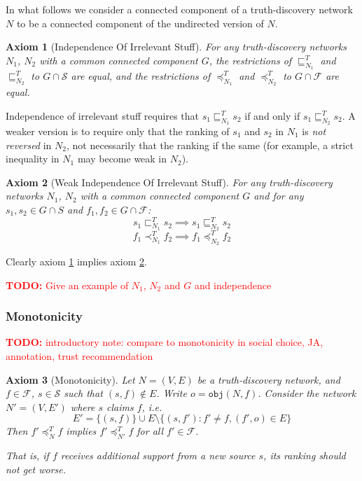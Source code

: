\documentclass{article}
\theoremstyle{definition} \newtheorem{definition}{Definition}
\theoremstyle{definition} \newtheorem{example}{Example}
\theoremstyle{plain} \newtheorem{axiom}{Axiom}
\theoremstyle{plain} \newtheorem*{remark}{Remark}
\theoremstyle{remark} \newtheorem*{notation}{Notation}
\theoremstyle{plain} \newtheorem{lemma}{Lemma}
\theoremstyle{plain} \newtheorem{theorem}{Theorem}
\theoremstyle{plain} \newtheorem{proposition}{Proposition}
\newcommand{\todo}[1] {
    \textcolor{red}{
        \textbf{TODO:} #1
    }
}
\renewcommand{\S}{\mathcal{S}}  %
\newcommand{\F}{\mathcal{F}}
\newcommand{\sle}{\sqsubseteq}
\newcommand{\slt}{\sqsubset}
\newcommand{\fle}{\preceq}
\newcommand{\flt}{\prec}
\newcommand{\obj}{\texttt{obj}}
\begin{document}
In what follows we consider a connected component of a truth-discovery network
$N$ to be a connected component of the undirected version of $N$.

\begin{axiom}[Independence Of Irrelevant Stuff]
\label{axiom:indep}
For any truth-discovery networks $N_1$, $N_2$ with a common connected component
$G$, the restrictions of $\sle_{N_1}^T$ and $\sle_{N_2}^T$ to $G \cap \S$ are
equal, and the restrictions of $\fle_{N_1}^T$ and $\fle_{N_2}^T$ to $G \cap \F$
are equal.
\end{axiom}

Independence of irrelevant stuff requires that $s_1 \sle_{N_1}^T s_2$ if and
only if $s_1 \sle_{N_2}^T s_2$. A weaker version is to require only that the
ranking of $s_1$ and $s_2$ in $N_1$ is \emph{not reversed} in $N_2$, not
necessarily that the ranking if the same (for example, a strict inequality in
$N_1$ may become weak in $N_2$).

\begin{axiom}[Weak Independence Of Irrelevant Stuff]
\label{axiom:weak_indep}
For any truth-discovery networks $N_1$, $N_2$ with a common connected component
$G$ and for any $s_1, s_2 \in G \cap S$ and $f_1, f_2 \in G \cap \F$:
\[
    s_1 \slt_{N_1}^T s_2 \implies s_1 \sle_{N_2}^T s_2
\]
\[
    f_1 \flt_{N_1}^T f_2 \implies f_1 \fle_{N_2}^T f_2
\]
\end{axiom}

Clearly axiom \ref{axiom:indep} implies axiom \ref{axiom:weak_indep}.

\todo{Give an example of $N_1$, $N_2$ and $G$ and independence}

\subsubsection{Monotonicity}

\todo{introductory note: compare to monotonicity in social choice, JA,
annotation, trust recommendation}

\begin{axiom}[Monotonicity]
Let $N = (V, E)$ be a truth-discovery network, and $f \in \F$, $s \in \S$ such
that $(s, f) \notin E$. Write $o = \obj(N, f)$. Consider the network $N'=(V,
E')$ where $s$ claims $f$, i.e.
$$
    E' = \{(s, f)\} \cup E \setminus \{(s, f') : f' \ne f, (f', o) \in E\}
$$
Then $f' \fle_N^T f$ implies $f' \fle_{N'}^T f$ for all $f' \in \F$.

That is, if $f$ receives additional support from a new source $s$, its ranking
should not get worse.
\end{axiom}
\end{document}
